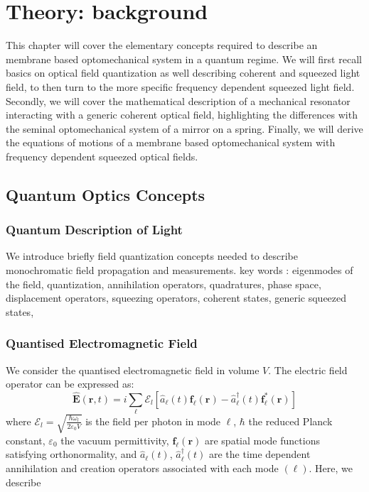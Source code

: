 \chapter{ Theory: background} \label{chap:theory}
This chapter will cover the elementary concepts required to describe an membrane based optomechanical system in a quantum regime. We will first recall basics on optical field quantization as well describing coherent and squeezed light field, to then turn to the more specific frequency dependent squeezed light field. Secondly, we will cover the mathematical description of a mechanical resonator interacting with a generic coherent optical field, highlighting the differences with the seminal optomechanical system of a mirror on a spring. Finally, we will derive the equations of motions of a membrane based optomechanical system with frequency dependent squeezed optical fields. 

\section{Quantum Optics Concepts}
\subsection{Quantum Description of Light}
We introduce briefly field quantization concepts needed to describe monochromatic field propagation and measurements.
key words : eigenmodes of the field, quantization, annihilation operators, quadratures, phase space, displacement operators, squeezing operators, coherent states, generic squeezed states,


\subsection*{Quantised Electromagnetic Field}

We consider the quantised electromagnetic field in volume $V$. The electric field operator can be expressed as:
\begin{equation}
\hat{\mathbf{E}}(\mathbf{r}, t) = i \sum_{ \ell} \mathcal{E}_l \left[ \hat{a}_{\ell}(t) \mathbf{f}_{\ell}(\mathbf{r}) - \hat{a}_{\ell}^\dagger(t) \mathbf{f}_{\ell}^*(\mathbf{r}) \right]
\end{equation}
where $\mathcal{E}_l = \sqrt{\frac{\hbar \omega_l}{2 \varepsilon_0 V}}$ is the field per photon in mode $\ell$, $\hbar$ the reduced Planck constant, $\varepsilon_0$ the vacuum permittivity, $\mathbf{f}_{\ell}(\mathbf{r})$ are spatial mode functions satisfying orthonormality, and $\hat{a}_{\ell}(t)$, $\hat{a}_{\ell}^\dagger(t)$ are the time dependent annihilation and creation operators associated with each mode $(\ell)$. Here, we describe 

